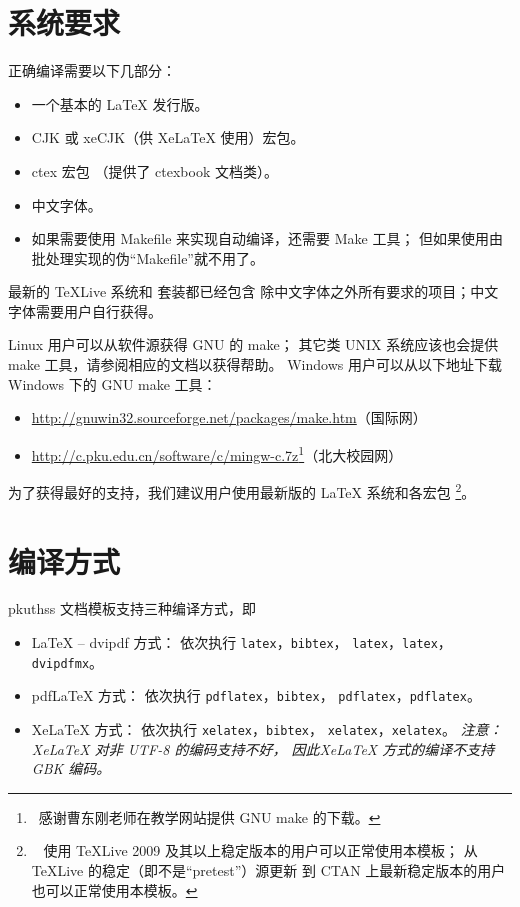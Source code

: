 	\section{系统要求}

	正确编译需要以下几部分：
	\begin{itemize}
		\item 一个基本的 \LaTeX{} 发行版。
		\item CJK 或 xeCJK（供 Xe\LaTeX{} 使用）宏包。
		\item ctex 宏包\cite{ctex-doc,ctexfaq}%
			（提供了 ctexbook 文档类）。
		\item 中文字体。
		\item 如果需要使用 Makefile 来实现自动编译，还需要 Make 工具；
			但如果使用由批处理实现的伪“Makefile”就不用了。
	\end{itemize}

	最新的 \TeX{}Live 系统和 \CTeX 套装都已经包含%
	除中文字体之外所有要求的项目；中文字体需要用户自行获得。

	Linux 用户可以从软件源获得 GNU 的 make；
	其它类 UNIX 系统应该也会提供 make 工具，请参阅相应的文档以获得帮助。%
	Windows 用户可以从以下地址下载 Windows 下的 GNU make 工具：
	\begin{itemize}
		\item
		\url{http://gnuwin32.sourceforge.net/packages/make.htm}（国际网）
		\item
		\url{http://c.pku.edu.cn/software/c/mingw-c.7z}\footnote%
		{\ 感谢曹东刚老师在教学网站提供 GNU make 的下载。}（北大校园网）
	\end{itemize}

	为了获得最好的支持，我们建议用户使用最新版的 \LaTeX{} 系统和各宏包%
	\footnote%
	{\ %
		使用 \TeX{}Live 2009 及其以上稳定版本的用户可以正常使用本模板；
		从 \TeX{}Live 的稳定（即不是“pretest”）源更新%
		到 CTAN 上最新稳定版本的用户也可以正常使用本模板。
	}。

	\section{编译方式}

	pkuthss 文档模板支持三种编译方式，即
	\begin{itemize}
	  \item \LaTeX{} -- dvipdf 方式：
		依次执行 \verb|latex|，\verb|bibtex|，%
		\verb|latex|，\verb|latex|，\verb|dvipdfmx|。
	  \item pdf\LaTeX{} 方式：
		依次执行 \verb|pdflatex|，\verb|bibtex|，%
		\verb|pdflatex|，\verb|pdflatex|。
	  \item Xe\LaTeX{} 方式：
		依次执行 \verb|xelatex|，\verb|bibtex|，%
		\verb|xelatex|，\verb|xelatex|。%
		\emph
		{%
			注意：Xe\LaTeX{} 对非 UTF-8 的编码支持不好，
			因此Xe\LaTeX{} 方式的编译不支持 GBK 编码。
		}
	\end{itemize}

